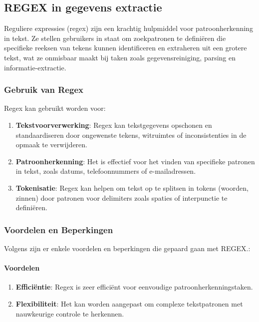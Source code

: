 



\subsection{REGEX in gegevens extractie}

Reguliere expressies (regex) zijn een krachtig hulpmiddel voor patroonherkenning in tekst. Ze stellen gebruikers in staat om zoekpatronen te definiëren die specifieke reeksen van tekens kunnen identificeren en extraheren uit een grotere tekst, wat ze onmisbaar maakt bij taken zoals gegevensreiniging, parsing en informatie-extractie.

\subsubsection{Gebruik van Regex}
Regex kan gebruikt worden voor:
\begin{enumerate}
    \item \textbf{Tekstvoorverwerking}: Regex kan tekstgegevens opschonen en standaardiseren door ongewenste tekens, witruimtes of inconsistenties in de opmaak te verwijderen.
    \item \textbf{Patroonherkenning}: Het is effectief voor het vinden van specifieke patronen in tekst, zoals datums, telefoonnummers of e-mailadressen.
    \item \textbf{Tokenisatie}: Regex kan helpen om tekst op te splitsen in tokens (woorden, zinnen) door patronen voor delimiters zoals spaties of interpunctie te definiëren.
\end{enumerate}

\subsubsection{Voordelen en Beperkingen}
Volgens \textcite{B_2022} zijn er enkele voordelen en beperkingen die gepaard gaan met REGEX.:
\paragraph{Voordelen}
\begin{enumerate}
    \item \textbf{Efficiëntie}: Regex is zeer efficiënt voor eenvoudige patroonherkenningstaken.
    \item \textbf{Flexibiliteit}: Het kan worden aangepast om complexe tekstpatronen met nauwkeurige controle te herkennen.
\end{enumerate}
